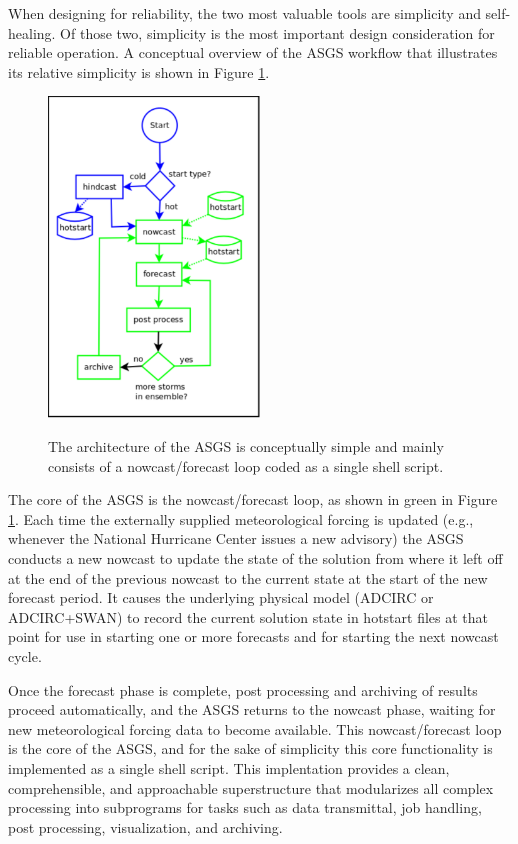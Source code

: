 \documentclass[jmse,article,submit,moreauthors,pdftex,12pt,a4paper]{mdpi}
\begin{document}
When designing for reliability, the two most valuable tools are 
simplicity and self-healing. Of those two, simplicity is the most 
important design consideration for reliable operation. A conceptual 
overview of the ASGS workflow that illustrates its relative 
simplicity is shown in Figure \ref{fig:asgs_overview}.

\begin{figure}[t]
  \centering
  \includegraphics[width=0.5\textwidth]{asgs_overview_color}\\
  \caption{The architecture of the ASGS is conceptually simple and mainly consists of a nowcast/forecast loop coded as a single shell script.}
  \label{fig:asgs_overview}
\end{figure}

The core of the ASGS is the nowcast/forecast loop, as shown in green 
in Figure \ref{fig:asgs_overview}. Each time the externally supplied 
meteorological forcing is updated (e.g., whenever the National 
Hurricane Center issues a new advisory) the ASGS conducts a new 
nowcast to update the state of the solution from where it left off 
at the end of the previous nowcast to the current state at the start 
of the new forecast period. It causes the underlying physical model 
(ADCIRC or ADCIRC+SWAN) to record the current solution state in 
hotstart files at that point for use in starting one or more 
forecasts and for starting the next nowcast cycle. 

Once the forecast phase is complete, post processing and archiving 
of results proceed automatically, and the ASGS returns to the 
nowcast phase, waiting for new meteorological forcing data to become 
available. This nowcast/forecast loop is the core of the ASGS, and 
for the sake of simplicity this core functionality is implemented as 
a single shell script. This implentation provides a clean, 
comprehensible, and approachable superstructure that modularizes all 
complex processing into subprograms for tasks such as data 
transmittal, job handling, post processing, visualization, and 
archiving.
\end{document}
